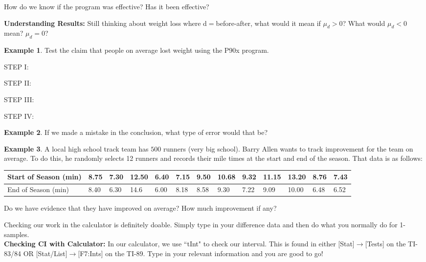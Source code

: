 \documentclass[12pt]{amsart}
\theoremstyle{definition}
\newtheorem{ex}{Example}
\begin{document}
\noindent How do we know if the program was effective? Has it been effective?
\vspace{0.5in}

\newpage
\noindent \textbf{Understanding Results:} Still thinking about weight loss where d$=$before-after, what would it mean if $\mu_d>0$? What would $\mu_d<0$ mean? $\mu_d=0$?
\vspace{1in}

\begin{ex} Test the claim that people on average lost weight using the P90x program.\end{ex}
STEP I:
\vspace{0.3in}

STEP II:
\vfill

STEP III:

\vfill

STEP IV:

\vfill

\begin{ex} If we made a mistake in the conclusion, what type of error would that be?\end{ex}
\vspace{1in}
\newpage
\begin{ex} A local high school track team has $500$ runners (very big school). Barry Allen wants to track improvement for the team on average. To do this, he randomly selects 12 runners and records their mile times at the start and end of the season. That data is as follows:
\vspace{0.2in}

\begin{center}
\begin{tabular}{l|l|l|l|l|l|l|l|l|l|l|l|l}
Start of Season (min) & 8.75 & 7.30 & 12.50 & 6.40 & 7.15 & 9.50 & 10.68 & 9.32 & 11.15 & 13.20 & 8.76 & 7.43\\
\hline
End of Season (min) & 8.40 & 6.30 & 14.6 & 6.00 & 8.18 & 8.58 & 9.30 & 7.22 & 9.09 & 10.00 & 6.48 & 6.52
\end{tabular}
\end{center}

\vspace{0.2in}
Do we have evidence that they have improved on average? How much improvement if any?
\end{ex}
\vfill
\vfill
\noindent Checking our work in the calculator is definitely doable. Simply type in your difference data and then do what you normally do for 1-samples.\\
\noindent \textbf{Checking CI with Calculator:} In our calculator, we use ``tInt" to check our interval. This is found in either [Stat]$\rightarrow$[Tests] on the TI-83/84 OR [Stat/List]$\rightarrow$[F7:Ints] on the TI-89. Type in your relevant information and you are good to go!\\
\end{document}
